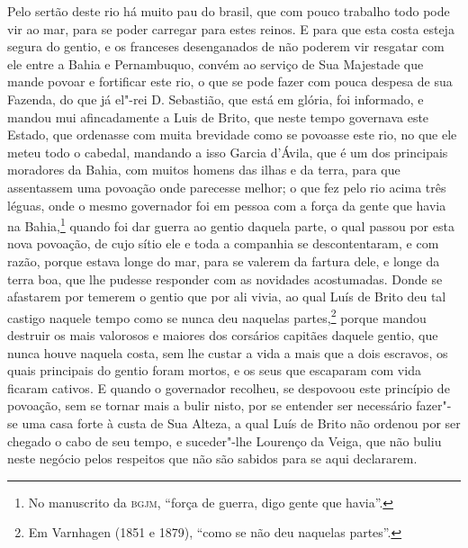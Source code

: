 \begin{linenumbers}
Pelo sertão deste rio há muito pau do brasil, que com pouco trabalho todo pode vir ao mar,
para se poder carregar para estes reinos. E para que esta costa esteja segura do gentio, e
os franceses desenganados de não poderem vir resgatar com ele entre a Bahia e Pernambuquo,
convém ao serviço de Sua Majestade que mande povoar e fortificar este rio, o que se pode
fazer com pouca despesa de sua Fazenda, do que já el"-rei D. Sebastião, que está em glória,
foi informado, e mandou mui afincadamente a Luis de Brito, que neste tempo governava este
Estado, que ordenasse com muita brevidade como se povoasse este rio, no que ele meteu todo
o cabedal, mandando a isso Garcia d'Ávila, que é um dos principais moradores da Bahia, com
muitos homens das ilhas e da terra, para que assentassem uma povoação onde parecesse
melhor; o que fez pelo rio acima três léguas, onde o mesmo governador foi em pessoa com a
força da gente que havia na Bahia,\footnote{ No manuscrito da \textsc{bgjm}, ``força de
guerra, digo gente que havia''.} quando foi dar guerra ao gentio daquela parte, o qual
passou por esta nova povoação, de cujo sítio ele e toda a companhia se descontentaram, e
com razão, porque estava longe do mar, para se valerem da fartura dele, e longe da terra
boa, que lhe pudesse responder com as novidades acostumadas. Donde se afastarem por
temerem o gentio que por ali vivia, ao qual Luís de Brito deu tal castigo naquele tempo
como se nunca deu naquelas partes,\footnote{ Em Varnhagen (1851 e 1879), ``como se não deu
naquelas partes''.} porque mandou destruir os mais valorosos e maiores dos corsários
capitães daquele gentio, que nunca houve naquela costa, sem lhe custar a vida a mais que a
dois escravos, os quais principais do gentio foram mortos, e os seus que escaparam com
vida ficaram cativos. E quando o governador recolheu, se despovoou este princípio de
povoação, sem se tornar mais a bulir nisto, por se entender ser necessário fazer"-se uma
casa forte à custa de Sua Alteza, a qual Luís de Brito não ordenou por ser chegado o cabo
de seu tempo, e suceder"-lhe Lourenço da Veiga, que não buliu neste negócio pelos respeitos
que não são sabidos para se aqui declararem.


\end{linenumbers}
